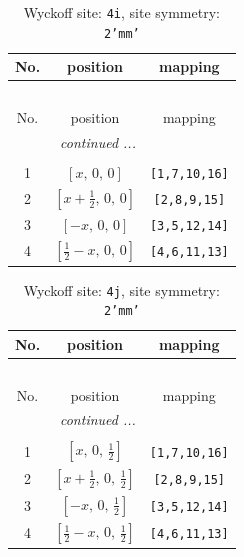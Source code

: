 \documentclass[fleqn,8pt]{jsarticle}
\begin{document}
\begin{longtable}{ccc}
\caption{Wyckoff site: {\tt 4i}, site symmetry: {\tt 2'mm'}}
 \\
 \hline \hline
No. & position & mapping \\ \hline \endfirsthead

\multicolumn{2}{l}{\tablename\ \thetable{}} \\
 \hline \hline
No. & position & mapping \\ \hline \endhead

 \hline \hline
\multicolumn{2}{r}{\footnotesize\it continued ...} \\ \endfoot

 \hline \hline
\multicolumn{2}{r}{} \\ \endlastfoot

1 & $\left[ x,\, 0,\, 0 \right]$ & {\tt [1,7,10,16]} \\ \hline
2 & $\left[ x + \frac{1}{2},\, 0,\, 0 \right]$ & {\tt [2,8,9,15]} \\ \hline
3 & $\left[ - x,\, 0,\, 0 \right]$ & {\tt [3,5,12,14]} \\ \hline
4 & $\left[ \frac{1}{2} - x,\, 0,\, 0 \right]$ & {\tt [4,6,11,13]} \\
\end{longtable}
\renewcommand{\arraystretch}{1.2}
\begin{longtable}{ccc}
\caption{Wyckoff site: {\tt 4j}, site symmetry: {\tt 2'mm'}}
 \\
 \hline \hline
No. & position & mapping \\ \hline \endfirsthead

\multicolumn{2}{l}{\tablename\ \thetable{}} \\
 \hline \hline
No. & position & mapping \\ \hline \endhead

 \hline \hline
\multicolumn{2}{r}{\footnotesize\it continued ...} \\ \endfoot

 \hline \hline
\multicolumn{2}{r}{} \\ \endlastfoot

1 & $\left[ x,\, 0,\, \frac{1}{2} \right]$ & {\tt [1,7,10,16]} \\ \hline
2 & $\left[ x + \frac{1}{2},\, 0,\, \frac{1}{2} \right]$ & {\tt [2,8,9,15]} \\ \hline
3 & $\left[ - x,\, 0,\, \frac{1}{2} \right]$ & {\tt [3,5,12,14]} \\ \hline
4 & $\left[ \frac{1}{2} - x,\, 0,\, \frac{1}{2} \right]$ & {\tt [4,6,11,13]} \\
\end{longtable}
\end{document}
